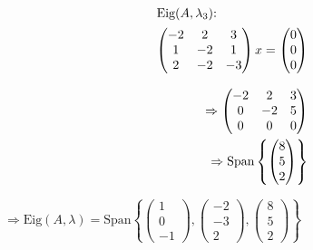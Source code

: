 \documentclass{HM}
\newcommand{\Eig}{\text{Eig}}
\newcommand{\Span}{\text{Span}}
\begin{document}
\begin{enumerate}
\begin{minipage}{.33\textwidth}
	\end{minipage}
	\begin{minipage}{.33\textwidth}
		\begin{align*}
		\intertext{$\Eig(A, \lambda_3)$:}
		\begin{pmatrix}
			-2&2&3\\
			1&-2&1\\
			2&-2&-3
		\end{pmatrix}x=\begin{pmatrix}
			0\\0\\0
		\end{pmatrix}\\
		\intertext{}
		\Rightarrow\begin{pmatrix}
			-2&2&3\\
			0&-2&5\\
			0&0&0
		\end{pmatrix}\\
		\Rightarrow\Span\left\lbrace\begin{pmatrix}
			8\\
			5\\
			2
		\end{pmatrix}\right\rbrace
		\end{align*}
		\end{minipage}
		$\Rightarrow \Eig(A,\lambda)=\Span\left\lbrace\begin{pmatrix}
			1\\0\\-1
		\end{pmatrix},\begin{pmatrix}
			-2\\-3\\2
		\end{pmatrix},\begin{pmatrix}
			8\\5\\2
		\end{pmatrix}\right\rbrace$
		

\end{enumerate}
\end{document}
